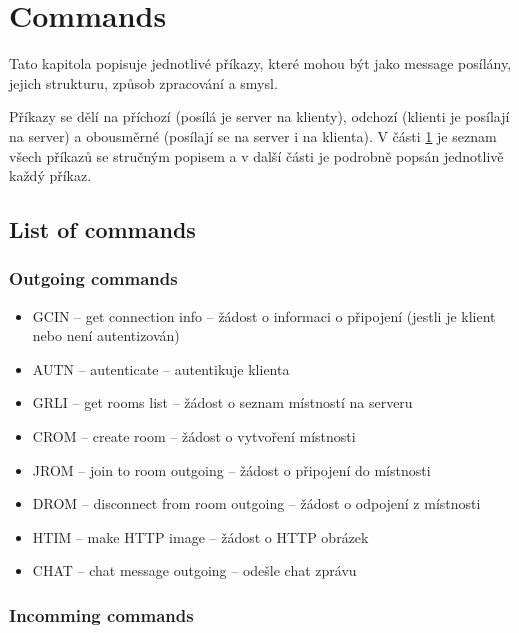 \part{Commands}
\label{commands}

Tato kapitola popisuje jednotlivé příkazy, které mohou být jako message posílány, jejich strukturu, způsob zpracování a smysl.

Příkazy se dělí na příchozí (posílá je server na klienty), odchozí (klienti je posílají na server) a obousměrné (posílají se na server i na klienta). V části \ref{commands.list_of_commands} je seznam všech příkazů se stručným popisem a v další části je podrobně popsán jednotlivě každý příkaz.

\chapter{List of commands}
\label{commands.list_of_commands}

\section{Outgoing commands}

\begin{itemize}
    \item GCIN -- get connection info -- žádost o informaci o připojení (jestli je klient nebo není autentizován)
    \item AUTN -- autenticate -- autentikuje klienta
    \item GRLI -- get rooms list -- žádost o seznam místností na serveru
    \item CROM -- create room -- žádost o vytvoření místnosti
    \item JROM -- join to room outgoing -- žádost o připojení do místnosti
    \item DROM -- disconnect from room outgoing -- žádost o odpojení z místnosti
	\item HTIM -- make HTTP image -- žádost o HTTP obrázek
	\item CHAT -- chat message outgoing -- odešle chat zprávu
\end{itemize}

\section{Incomming commands}

